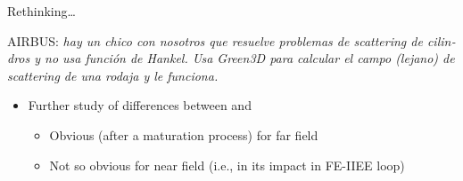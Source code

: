 
  \begin{frame}[plain]
    \centering    \Large{Rethinking\ldots}

    \vspace*{0.5\baselineskip}

    \centering\parbox{\textwidth}{%
      AIRBUS: \emph{\foreignlanguage{spanish}{hay un chico con nosotros que
          resuelve problemas de scattering de cilindros y no usa
          función de Hankel. Usa Green3D para calcular el campo
          (lejano) de scattering de una rodaja y \alert{le funciona.}}
        }}

      \vspace*{\baselineskip}
      
      \begin{itemize}
      \item Further study of differences between  {\GreenD} and {\GreenT}
        \begin{itemize}
        \item Obvious (after a maturation process) for far field
        \item Not so obvious for near field (i.e., in its impact in
          FE-IIEE loop)
        \end{itemize}
      \end{itemize}
      
  \end{frame}
  


